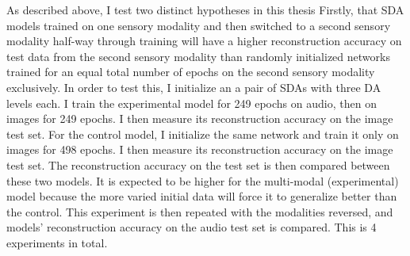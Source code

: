 \documentclass[12pt]{article}
\begin{document}
\begin{doublespacing}

	As described above, I test two distinct hypotheses in this thesis Firstly, that SDA models trained on one sensory modality and then switched to a second sensory modality half-way through training will have a higher reconstruction accuracy on test data from the second sensory modality than randomly initialized networks trained for an equal total number of epochs on the second sensory modality exclusively. In order to test this, I initialize an a pair of SDAs with three DA levels each. I train the experimental model for 249 epochs on audio, then on images for 249 epochs. I then measure its reconstruction accuracy on the image test set. For the control model, I initialize the same network and train it only on images for 498 epochs. I then measure its reconstruction accuracy on the image test set. The reconstruction accuracy on the test set is then compared between these two models. It is expected to be higher for the multi-modal (experimental) model because the more varied initial data will force it to generalize better than the control. This experiment is then repeated with the modalities reversed, and models' reconstruction accuracy on the audio test set is compared. This is 4 experiments in total. 
	

\end{doublespacing}
\end{document}
